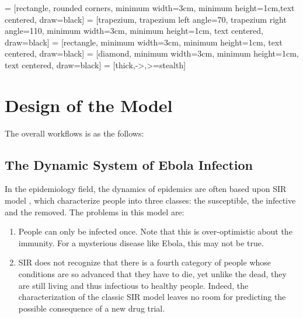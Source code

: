 \documentclass[12pt,a4paper,titlepage]{article}
\begin{document}
 = [rectangle, rounded corners, minimum width=3cm, minimum height=1cm,text centered, draw=black]
 = [trapezium, trapezium left angle=70, trapezium right angle=110, minimum width=3cm, minimum height=1cm, text centered, draw=black]
 = [rectangle, minimum width=3cm, minimum height=1cm, text centered, draw=black]
 = [diamond, minimum width=3cm, minimum height=1cm, text centered, draw=black]
 = [thick,->,>=stealth]

\section{Design of the Model}
\label{section_designModel}
The overall workflows is as the follows:
\begin{center}
\end{center}
\subsection{The Dynamic System of Ebola Infection}
\label{section_dynamicInfect}
In the epidemiology field, the dynamics of epidemics are often based upon SIR model \cite{kermack1927contribution}, which characterize people into three classes: the susceptible, the infective and the removed. The problems in this model are:
\begin{enumerate}
	\item People can only be infected once. Note that this is over-optimistic about the immunity. For a mysterious disease like Ebola, this may not be true.
	\item SIR does not recognize that there is a fourth category of people whose conditions are so advanced that they have to die, yet unlike the dead, they are still living and thus infectious to healthy people. Indeed, the characterization of the classic SIR model leaves no room for predicting the possible consequence of a new drug trial.
\end{enumerate}
\end{document}
